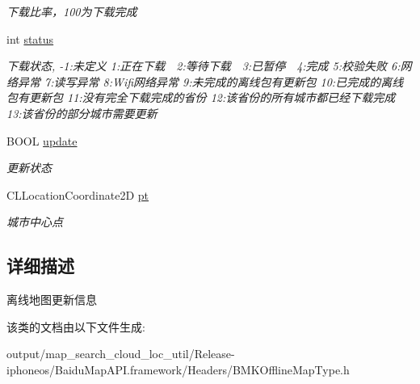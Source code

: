\begin{DoxyCompactItemize}
\begin{DoxyCompactList}\small\item\em 下载比率，100为下载完成 \end{DoxyCompactList}\item 
\hypertarget{interface_b_m_k_o_l_update_element_a1e980d13929fc0dc732edddf1ae13bf2}{}int \hyperlink{interface_b_m_k_o_l_update_element_a1e980d13929fc0dc732edddf1ae13bf2}{status}\label{interface_b_m_k_o_l_update_element_a1e980d13929fc0dc732edddf1ae13bf2}

\begin{DoxyCompactList}\small\item\em 下载状态, -\/1\+:未定义 1\+:正在下载　2\+:等待下载　3\+:已暂停　4\+:完成 5\+:校验失败 6\+:网络异常 7\+:读写异常 8\+:Wifi网络异常 9\+:未完成的离线包有更新包 10\+:已完成的离线包有更新包 11\+:没有完全下载完成的省份 12\+:该省份的所有城市都已经下载完成 13\+:该省份的部分城市需要更新 \end{DoxyCompactList}\item 
\hypertarget{interface_b_m_k_o_l_update_element_a1adc137eba11d9ae142310d3556bc446}{}B\+O\+O\+L \hyperlink{interface_b_m_k_o_l_update_element_a1adc137eba11d9ae142310d3556bc446}{update}\label{interface_b_m_k_o_l_update_element_a1adc137eba11d9ae142310d3556bc446}

\begin{DoxyCompactList}\small\item\em 更新状态 \end{DoxyCompactList}\item 
\hypertarget{interface_b_m_k_o_l_update_element_a9e229b507ced476146db8f80c71ea5bd}{}C\+L\+Location\+Coordinate2\+D \hyperlink{interface_b_m_k_o_l_update_element_a9e229b507ced476146db8f80c71ea5bd}{pt}\label{interface_b_m_k_o_l_update_element_a9e229b507ced476146db8f80c71ea5bd}

\begin{DoxyCompactList}\small\item\em 城市中心点 \end{DoxyCompactList}\end{DoxyCompactItemize}


\subsection{详细描述}
离线地图更新信息 

该类的文档由以下文件生成\+:\begin{DoxyCompactItemize}
\item 
output/map\+\_\+search\+\_\+cloud\+\_\+loc\+\_\+util/\+Release-\/iphoneos/\+Baidu\+Map\+A\+P\+I.\+framework/\+Headers/B\+M\+K\+Offline\+Map\+Type.\+h\end{DoxyCompactItemize}
